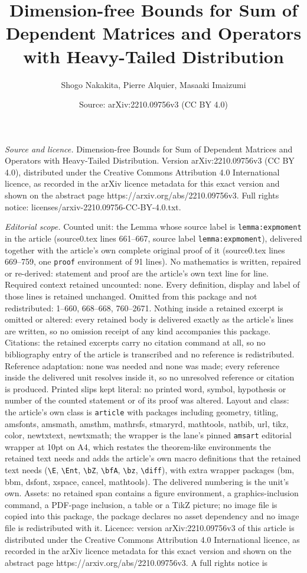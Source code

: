 \documentclass[10pt,a4paper]{amsart}
\title[Dimension-free Bounds for Sum of Dependent Matrices and Oper]{Dimension-free Bounds for Sum of Dependent Matrices and Operators with Heavy-Tailed Distribution}
\author{Shogo Nakakita, Pierre Alquier, Masaaki Imaizumi}
\date{Source: arXiv:2210.09756v3 (CC BY 4.0)}
\begin{document}
\maketitle

\noindent\emph{Source and licence.} Dimension-free Bounds for Sum of Dependent Matrices and Operators with Heavy-Tailed Distribution. Version arXiv:2210.09756v3 (CC BY 4.0), distributed under the Creative Commons Attribution 4.0 International licence, as recorded in the arXiv licence metadata for this exact version and shown on the abstract page https://arxiv.org/abs/2210.09756v3. Full rights notice: licenses/arxiv-2210.09756-CC-BY-4.0.txt.\par\smallskip

\noindent\textit{Editorial scope.} Counted unit: the Lemma whose source label is \texttt{lemma:expmoment} in the article (source0.tex lines 661--667, source label \texttt{lemma:expmoment}), delivered together with the article's own complete original proof of it (source0.tex lines 669--759, one \texttt{proof} environment of 91 lines). No mathematics is written, repaired or re-derived: statement and proof are the article's own text line for line. Required context retained uncounted: none. Every definition, display and label of those lines is retained unchanged. Omitted from this package and not redistributed: 1--660, 668--668, 760--2671. Nothing inside a retained excerpt is omitted or altered: every retained body is delivered exactly as the article's lines are written, so no omission receipt of any kind accompanies this package. Citations: the retained excerpts carry no citation command at all, so no bibliography entry of the article is transcribed and no reference is redistributed. Reference adaptation: none was needed and none was made; every reference inside the delivered unit resolves inside it, so no unresolved reference or citation is produced. Printed slips kept literal: no printed word, symbol, hypothesis or number of the counted statement or of its proof was altered. Layout and class: the article's own class is \texttt{article} with packages including geometry, titling, amsfonts, amsmath, amsthm, mathrsfs, stmaryrd, mathtools, natbib, url, tikz, color, newtxtext, newtxmath; the wrapper is the lane's pinned \texttt{amsart} editorial wrapper at 10pt on A4, which restates the theorem-like environments the retained text needs and adds the article's own macro definitions that the retained text needs (\texttt{\textbackslash E}, \texttt{\textbackslash Ent}, \texttt{\textbackslash bZ}, \texttt{\textbackslash bfA}, \texttt{\textbackslash bz}, \texttt{\textbackslash diff}), with extra wrapper packages (bm, bbm, dsfont, xspace, cancel, mathtools). The delivered numbering is the unit's own. Assets: no retained span contains a figure environment, a graphics-inclusion command, a PDF-page inclusion, a table or a TikZ picture; no image file is copied into this package, the package declares no asset dependency and no image file is redistributed with it. Licence: version arXiv:2210.09756v3 of this article is distributed under the Creative Commons Attribution 4.0 International licence, as recorded in the arXiv licence metadata for this exact version and shown on the abstract page https://arxiv.org/abs/2210.09756v3. A full rights notice is 
\end{document}
